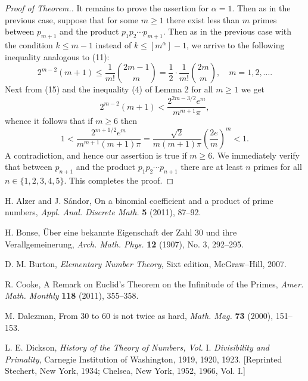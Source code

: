 \documentclass[12pt]{amsart}
\begin{document}
{\begin{proof}[Proof of Theorem.]
It remains to prove the assertion for $\alpha =1$. 
Then as in the previous case, suppose that for some $m\ge 1$ there exist 
less  than $m$ primes between $p_{m+1}$ and the product 
$p_1p_2\cdots p_{m+1}$. Then as in the previous case with the
condition $k\le m-1$ instead of $k\le \left[m^{\alpha}\right]-1$,
we arrive to the following inequality  analogous to (11):
 \begin{equation}
 2^{m-2}(m+1)\le \frac{1}{m!}{2m-1\choose m}=\frac{1}{2}\cdot 
\frac{1}{m!}{2m\choose m}, \quad m=1,2,\ldots.
  \end{equation}
Next from (15) and the inequality (4) of Lemma 2 for all
$m\ge 1$ we get 
 \begin{equation*}
 2^{m-2}(m+1)<\frac{2^{2m-3/2}e^m}{m^{m+1}\pi},
  \end{equation*}
whence it follows that if $m\ge 6$  then
 \begin{equation*}
1<\frac{2^{m+1/2}e^m}{m^{m+1}(m+1)\pi}=\frac{\sqrt{2}}{m(m+1)\pi}
\left(\frac{2e}{m}\right)^m<1.
  \end{equation*}
A contradiction, and hence our assertion is true if $m\ge 6$.
We immediately verify that  between $p_{n+1}$ and the product 
$p_1p_2\cdots p_{n+1}$ there are at least $n$ primes for all
$n\in\{1,2,3,4,5\}$. This completes the proof.
 \end{proof}
           \begin{thebibliography}{999}
 H. Alzer and J. S\'{a}ndor, On a binomial coefficient and a 
product of prime numbers, {\it Appl. Anal. Discrete Math.} {\bf 5} (2011), 
87--92.

 H. Bonse, \"{U}ber eine bekannte Eigenschaft der Zahl 30
und ihre Verallgemeinerung, {\it Arch. Math. Phys.} 
{\bf 12} (1907), No. 3, 292--295.

 D. M. Burton, {\it Elementary Number Theory}, Sixt edition,
McGraw--Hill, 2007.

 R. Cooke,  A Remark on Euclid's Theorem on the Infinitude of the 
Primes,  {\it Amer. Math. Monthly} {\bf 118} (2011), 355--358. 

 M. Dalezman, From 30 to 60 is not twice as hard, 
{\it Math. Mag.} {\bf 73} (2000), 151--153. 

 L. E. Dickson, {\it History of the Theory of Numbers,
Vol.} I. {\it Divisibility and Primality}, Carnegie 
Institution of Washington, 1919, 1920, 1923. [Reprinted Stechert, New York,
1934; Chelsea, New York, 1952, 1966, Vol. I.]


\end{thebibliography}}
\end{document}
